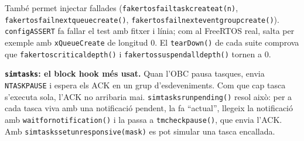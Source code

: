 \documentclass[11pt,a4paper]{article}
\DeclareRobustCommand{\_}{\textunderscore\allowbreak}
\newcommand{\cd}[1]{\texttt{#1}}
\begin{document}
També permet injectar fallades (\cd{fake\_rtos\_fail\_task\_create\_at(n)},
\cd{fake\_rtos\_fail\_next\_queue\_create()}, \cd{fake\_rtos\_fail\_next\_event\_group\_create()}).
\cd{configASSERT} fa fallar el test amb fitxer i línia; com al FreeRTOS real, salta per
exemple amb \cd{xQueueCreate} de longitud 0. El \cd{tearDown()} de cada suite comprova que
\cd{fake\_rtos\_critical\_depth()} i \cd{fake\_rtos\_suspend\_all\_depth()} tornen a 0.

\textbf{\cd{sim\_tasks}: el block hook més usat.} Quan l'OBC pausa tasques, envia
\cd{N\_TASK\_PAUSE} i espera els ACK en un grup d'esdeveniments. Com que cap tasca
s'executa sola, l'ACK no arribaria mai. \cd{sim\_tasks\_run\_pending()} resol això: per
a cada tasca viva amb una notificació pendent, la fa ``actual'', llegeix la notificació
amb \cd{wait\_for\_notification()} i la passa a \cd{tm\_check\_pause()}, que envia l'ACK.
Amb \cd{sim\_tasks\_set\_unresponsive(mask)} es pot simular una tasca encallada.
\end{document}
